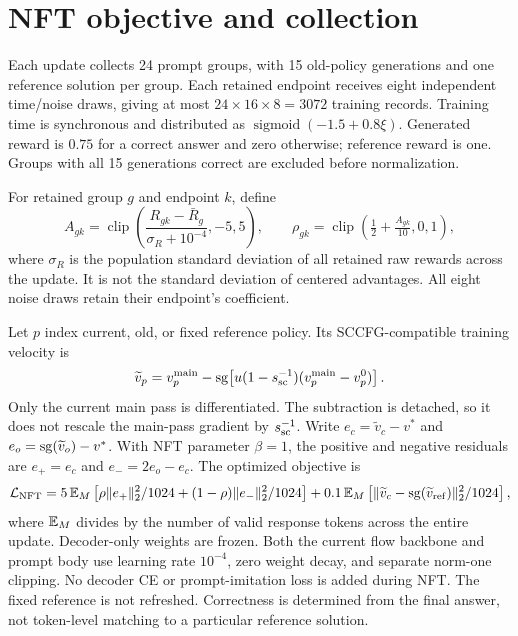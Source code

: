 \section{NFT objective and collection}
\label{app:nft}
Each update collects 24 prompt groups, with 15 old-policy generations and one reference solution per group. Each retained endpoint receives eight independent time/noise draws, giving at most $24\times16\times8=3072$ training records. Training time is synchronous and distributed as $\operatorname{sigmoid}(-1.5+0.8\xi)$. Generated reward is $0.75$ for a correct answer and zero otherwise; reference reward is one. Groups with all 15 generations correct are excluded before normalization.

For retained group $g$ and endpoint $k$, define
\begin{equation}
 A_{gk}=\operatorname{clip}\left(\frac{R_{gk}-\bar R_g}{\sigma_R+10^{-4}},-5,5\right),
 \qquad \rho_{gk}=\operatorname{clip}\left(\tfrac12+\tfrac{A_{gk}}{10},0,1\right),
\end{equation}
where $\sigma_R$ is the population standard deviation of all retained raw rewards across the update. It is not the standard deviation of centered advantages. All eight noise draws retain their endpoint's coefficient.

Let $p$ index current, old, or fixed reference policy. Its SCCFG-compatible training velocity is
\begin{equation}
 \widetilde v_p=v_p^{\rm main}-\operatorname{sg}\!\left[u(1-s_{\rm sc}^{-1})(v_p^{\rm main}-v_p^0)\right].
\end{equation}
Only the current main pass is differentiated. The subtraction is detached, so it does not rescale the main-pass gradient by $s_{\rm sc}^{-1}$. Write $e_c=\widetilde v_c-v^*$ and $e_o=\operatorname{sg}(\widetilde v_o)-v^*$. With NFT parameter $\beta=1$, the positive and negative residuals are $e_+=e_c$ and $e_-=2e_o-e_c$. The optimized objective is
\begin{equation}
 \mathcal L_{\rm NFT}=
 5\,\mathbb{E}_M\left[\rho\|e_+\|_2^2/1024+(1-\rho)\|e_-\|_2^2/1024\right]
 +0.1\,\mathbb{E}_M\left[\|\widetilde v_c-\operatorname{sg}(\widetilde v_{\rm ref})\|_2^2/1024\right],
\end{equation}
where $\mathbb{E}_M$ divides by the number of valid response tokens across the entire update. Decoder-only weights are frozen. Both the current flow backbone and prompt body use learning rate $10^{-4}$, zero weight decay, and separate norm-one clipping. No decoder CE or prompt-imitation loss is added during NFT. The fixed reference is not refreshed. Correctness is determined from the final answer, not token-level matching to a particular reference solution.

